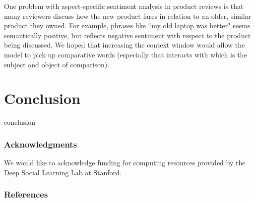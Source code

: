 \documentclass{article} %
\begin{document}
One problem with aspect-specific sentiment analysis in product reviews is that many reviewers discuss how the new product fares in relation to an older, similar product they owned. For example, phrases like ``my old laptop was better" seems semantically positive, but reflects negative sentiment with respect to the product being discussed. We hoped that increasing the context window would allow the model to pick up comparative words (especially that interacts with which is the subject and object of comparison).



\section{Conclusion}

conclusion







\subsubsection*{Acknowledgments}

We would like to acknowledge funding for computing resources provided by the Deep Social Learning Lab at Stanford.

\subsubsection*{References} %
\end{document}
